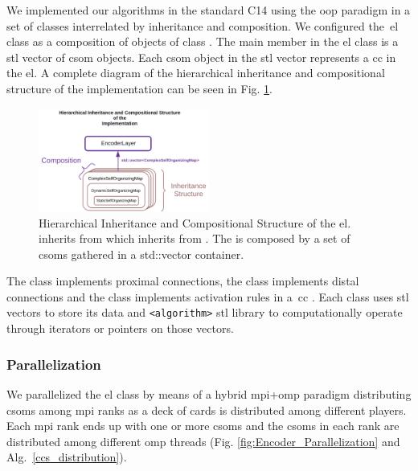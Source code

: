 \documentclass[10pt,journal,compsoc]{IEEEtran}
\newcommand{\CC}{C\nolinebreak\hspace{-.05em}\raisebox{.4ex}{\tiny\bf +}\nolinebreak\hspace{-.10em}\raisebox{.4ex}{\tiny\bf +}}
\begin{document}
We implemented our algorithms in the standard \CC14 using the \gls{oop} paradigm in a set of classes interrelated by inheritance and composition. We configured the~\gls{el} class as a composition of objects of class . The main member in the \gls{el} class is a \gls{stl} vector of \gls{csom} objects. Each \gls{csom} object in the \gls{stl} vector represents a \gls{cc} in the \gls{el}. A complete diagram of the hierarchical inheritance and compositional structure of the implementation can be seen in Fig. \ref{fig:InheritanceComposition}.

\begin{figure}[h!]
    \centering
    \includegraphics[width=0.5\textwidth]{InheritanceComposition.png}
    \caption{Hierarchical Inheritance and Compositional Structure of the \gls{el}.  inherits from  which inherits from . The  is composed by a set of \glspl{csom} gathered    in a std::vector  container.}
    \label{fig:InheritanceComposition}
\end{figure}

The  class implements proximal connections, the  class implements distal connections and the  class implements activation rules in a~\gls{cc} \cite{Dematties2018}. Each class uses \gls{stl} vectors to store its data and \texttt{<algorithm>} \gls{stl} library to computationally operate through iterators or pointers on those vectors.










\subsubsection{ Parallelization}

We parallelized the \gls{el} class by means of a hybrid \gls{mpi}+\gls{omp} paradigm distributing \glspl{csom} among \gls{mpi} ranks as a deck of cards is distributed among different players. Each \gls{mpi} rank ends up with one or more \glspl{csom} and the \glspl{csom} in each rank are distributed among different \gls{omp} threads (Fig. \ref{fig:Encoder_Parallelization} and Alg.~\ref{ccs_distribution}).
\end{document}

